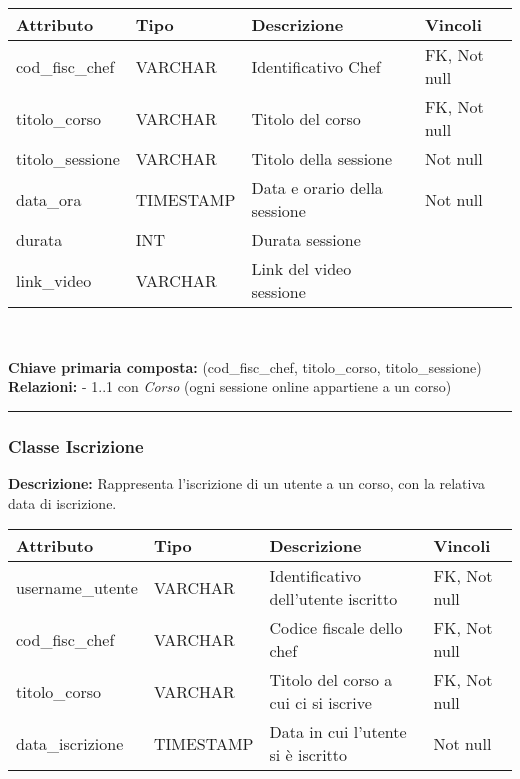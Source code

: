 \documentclass[a4paper, 12pt]{article}
\begin{document}
        {
        \vspace{1em}
        \renewcommand{\arraystretch}{1.3}
        \begin{tabularx}{\textwidth}{|l|l|X|l|}
        \hline
        \textbf{Attributo} & \textbf{Tipo} & \textbf{Descrizione} & \textbf{Vincoli} \\
        \hline
        cod\_fisc\_chef  & VARCHAR      & Identificativo Chef & FK, Not null \\
        titolo\_corso    & VARCHAR      & Titolo del corso & FK, Not null \\
        titolo\_sessione & VARCHAR      & Titolo della sessione & Not null \\
        data\_ora        & TIMESTAMP    & Data e orario della sessione & Not null \\
        durata           & INT          & Durata sessione & \\
        link\_video      & VARCHAR      & Link del video sessione & \\
        \hline
        \end{tabularx}\\[0.5em]
        }
        
        \noindent\textbf{Chiave primaria composta:} (cod\_fisc\_chef, titolo\_corso, titolo\_sessione)\\[0.1em]
        
        \noindent\textbf{Relazioni:}  
        - 1..1 con \textit{Corso} (ogni sessione online appartiene a un corso)
        
    \noindent\rule{\textwidth}{0.1pt}

    \subsubsection*{Classe Iscrizione}
        \textbf{Descrizione:} Rappresenta l'iscrizione di un utente a un corso, con la relativa data di iscrizione.
        
        {
        \vspace{1em}
        \renewcommand{\arraystretch}{1.3}
        \begin{tabularx}{\textwidth}{|l|l|X|l|}
        \hline
        \textbf{Attributo} & \textbf{Tipo} & \textbf{Descrizione} & \textbf{Vincoli} \\
        \hline
        username\_utente    & VARCHAR         & Identificativo dell'utente iscritto & FK, Not null \\
        cod\_fisc\_chef & VARCHAR     & Codice fiscale dello chef & FK, Not null \\
        titolo\_corso & VARCHAR       & Titolo del corso a cui ci si iscrive & FK, Not null \\
        data\_iscrizione & TIMESTAMP  & Data in cui l'utente si è iscritto & Not null \\
        \hline
        \end{tabularx}\\[0.5em]
        }
        
\end{document}

